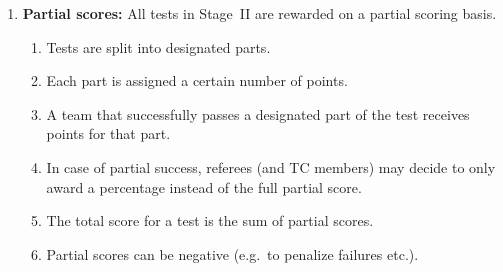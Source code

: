 \begin{enumerate}
	\item \textbf{Partial scores:} All tests in Stage~II are rewarded on a partial scoring basis. 
	\begin{enumerate}
		\item Tests are split into designated parts.
		\item Each part is assigned a certain number of points.
		\item A team that successfully passes a designated part of the test receives points for that part.
		\item In case of partial success, referees (and TC members) may decide to only award a percentage instead of the full partial score.  
		\item The total score for a test is the sum of partial scores.
		\item Partial scores can be negative (e.g.~to penalize failures etc.).
	\end{enumerate}
\end{enumerate}


